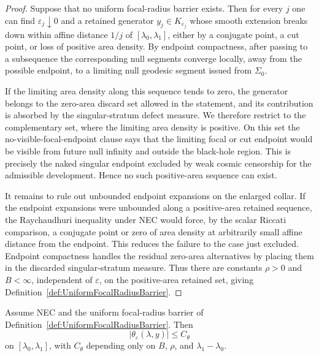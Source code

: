 \begin{proof}
Suppose that no uniform focal-radius barrier exists. Then for every $j$ one can find $\varepsilon_j\downarrow0$ and a retained generator $y_j\in K_{\varepsilon_j}$ whose smooth extension breaks down within affine distance $1/j$ of $[\lambda_0,\lambda_1]$, either by a conjugate point, a cut point, or loss of positive area density. By endpoint compactness, after passing to a subsequence the corresponding null segments converge locally, away from the possible endpoint, to a limiting null geodesic segment issued from $\Sigma_0$.

If the limiting area density along this sequence tends to zero, the generator belongs to the zero-area discard set allowed in the statement, and its contribution is absorbed by the singular-stratum defect measure. We therefore restrict to the complementary set, where the limiting area density is positive. On this set the no-visible-focal-endpoint clause says that the limiting focal or cut endpoint would be visible from future null infinity and outside the black-hole region. This is precisely the naked singular endpoint excluded by weak cosmic censorship for the admissible development. Hence no such positive-area sequence can exist.

It remains to rule out unbounded endpoint expansions on the enlarged collar. If the endpoint expansions were unbounded along a positive-area retained sequence, the Raychaudhuri inequality under NEC would force, by the scalar Riccati comparison, a conjugate point or zero of area density at arbitrarily small affine distance from the endpoint. This reduces the failure to the case just excluded. Endpoint compactness handles the residual zero-area alternatives by placing them in the discarded singular-stratum measure. Thus there are constants $\rho>0$ and $B<\infty$, independent of $\varepsilon$, on the positive-area retained set, giving Definition~\ref{def:UniformFocalRadiusBarrier}.
\end{proof}

\begin{lemma}\label{lem:RiccatiFocalBarrierExpansion}
Assume NEC and the uniform focal-radius barrier of Definition~\ref{def:UniformFocalRadiusBarrier}. Then
\[
    |\theta_\varepsilon(\lambda,y)|\le C_\theta
\]
on $[\lambda_0,\lambda_1]$, with $C_\theta$ depending only on $B$, $\rho$, and $\lambda_1-\lambda_0$.
\end{lemma}

